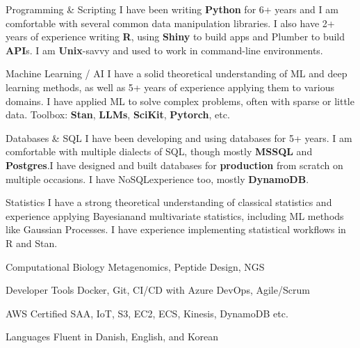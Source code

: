 


\begin{cvskills}


\cvskill
{Programming \& Scripting} %
{I have been writing \textbf{Python} for 6+ years and I am comfortable with several common data manipulation libraries. I also have 2+ years of experience writing \textbf{R}, using \textbf{Shiny} to build apps and Plumber to build \textbf{API}s. I am \textbf{Unix}-savvy and used to work in command-line environments.} %


\cvskill
{Machine Learning / AI} %
{I have a solid theoretical understanding of ML and deep learning methods, as well as 5+ years of experience applying them to various domains. I have applied ML to solve complex problems, often with sparse or little data. Toolbox: \textbf{Stan}, \textbf{LLMs}, \textbf{SciKit}, \textbf{Pytorch}, etc.} %


\cvskill
{Databases \& SQL}
{I have been developing and using databases for 5+ years. I am comfortable with multiple dialects of SQL, though mostly \textbf{MSSQL} and \textbf{Postgres}.I have designed and built databases for \textbf{production} from scratch on multiple occasions. I have NoSQLexperience too, mostly \textbf{DynamoDB}.}

\cvskill
{Statistics}
{I have a strong theoretical understanding of classical statistics and experience applying Bayesianand multivariate statistics, including ML methods like Gaussian Processes. I have experience implementing statistical workflows in R and Stan.}

\cvskill
{Computational Biology}
{Metagenomics, Peptide Design, NGS}

\cvskill
{Developer Tools}
{Docker, Git, CI/CD with Azure DevOps, Agile/Scrum}

\cvskill
{AWS}
{Certified SAA, IoT, S3, EC2, ECS, Kinesis, DynamoDB etc.}


\cvskill
{Languages} %
{Fluent in Danish, English, and Korean} %


\end{cvskills}